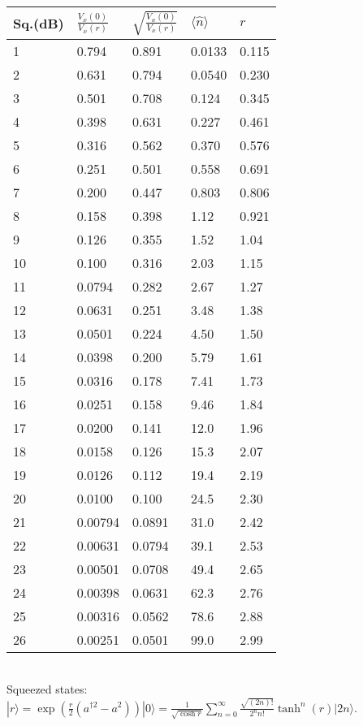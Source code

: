 \documentclass[12pt,letterpaper]{article}
\newcommand{\ket}[1]{| #1 \rangle}
\begin{document}
\begin{table}[!h]
\centering
{\Large
\begin{tabular}{lllll}
\hline
Sq.(dB) & ${\frac{V_x(0)}{V_x(r)}}$ & $\sqrt{\frac{V_x(0)}{V_x(r)}}$ & $\langle \hat n \rangle$ & $r$ \\

\hline
\hline
 1 & 0.794 & 0.891 & 0.0133 & 0.115 \\
 2 & 0.631 & 0.794 & 0.0540 & 0.230 \\
 3 & 0.501 & 0.708 & 0.124 & 0.345 \\
 4 & 0.398 & 0.631 & 0.227 & 0.461 \\
 5 & 0.316 & 0.562 & 0.370 & 0.576 \\
 6 & 0.251 & 0.501 & 0.558 & 0.691 \\
 7 & 0.200 & 0.447 & 0.803 & 0.806 \\
 8 & 0.158 & 0.398 & 1.12 & 0.921 \\
 9 & 0.126 & 0.355 & 1.52 & 1.04 \\
 10 & 0.100 & 0.316 & 2.03 & 1.15 \\
 11 & 0.0794 & 0.282 & 2.67 & 1.27 \\
 12 & 0.0631 & 0.251 & 3.48 & 1.38 \\
 13 & 0.0501 & 0.224 & 4.50 & 1.50 \\
 14 & 0.0398 & 0.200 & 5.79 & 1.61 \\
 15 & 0.0316 & 0.178 & 7.41 & 1.73 \\
 16 & 0.0251 & 0.158 & 9.46 & 1.84 \\
 17 & 0.0200 & 0.141 & 12.0 & 1.96 \\
 18 & 0.0158 & 0.126 & 15.3 & 2.07 \\
 19 & 0.0126 & 0.112 & 19.4 & 2.19 \\
 20 & 0.0100 & 0.100 & 24.5 & 2.30 \\
 21 & 0.00794 & 0.0891 & 31.0 & 2.42 \\
 22 & 0.00631 & 0.0794 & 39.1 & 2.53 \\
 23 & 0.00501 & 0.0708 & 49.4 & 2.65 \\
 24 & 0.00398 & 0.0631 & 62.3 & 2.76 \\
 25 & 0.00316 & 0.0562 & 78.6 & 2.88 \\
 26 & 0.00251 & 0.0501 & 99.0 & 2.99 \\
\hline
\end{tabular}
} \\
 {\small Squeezed states:
$\ket{r} =\exp\left(\frac{r}{2} (a^{\dagger 2}-a^2) \right)\ket{0} = \frac{1}{\sqrt{\cosh{r}}} \sum_{n=0}^\infty \frac{\sqrt{(2n)!}}{2^n n!} \tanh^n(r) \ket{2n}$. \\
}
\end{table}
\end{document}
